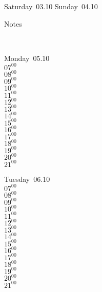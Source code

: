 \documentclass[11pt,a4paper]{book}\usepackage[]{graphicx}\usepackage[]{color}
\begin{document}
{{{{{{{{{{{{{{\begin{tcolorbox}
\end{tcolorbox} 
\begin{tcolorbox}[height=(\textheight-10mm)/6]
Saturday~03.10
\tcblower
Sunday~04.10
\end{tcolorbox} %
\begin{tcolorbox}[height=(\textheight-10mm)/6,sidebyside=false]
Notes
\end{tcolorbox}
\clearpage
\vspace{2 mm}\\
\begin{tcolorbox}
Monday~05.10\\
{ 
  $07^{00}$\\
$08^{00}$\\
$09^{00}$\\
$10^{00}$\\
$11^{00}$\\
$12^{00}$\\
$13^{00}$\\
$14^{00}$\\
$15^{00}$\\
$16^{00}$\\
$17^{00}$\\
$18^{00}$\\
$19^{00}$\\
$20^{00}$\\
$21^{00}$}\\

\end{tcolorbox}
\begin{tcolorbox}
Tuesday~06.10\\
{ 
  $07^{00}$\\
$08^{00}$\\
$09^{00}$\\
$10^{00}$\\
$11^{00}$\\
$12^{00}$\\
$13^{00}$\\
$14^{00}$\\
$15^{00}$\\
$16^{00}$\\
$17^{00}$\\
$18^{00}$\\
$19^{00}$\\
$20^{00}$\\
$21^{00}$}\\


\end{tcolorbox}}}}}}}}}}}}}}}
\end{document}
